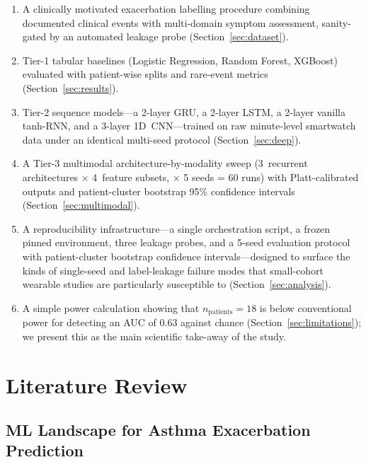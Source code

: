 \documentclass[11pt,a4paper]{article}
\begin{document}
\begin{enumerate}[nosep]
  \item A clinically motivated exacerbation labelling procedure combining
        documented clinical events with multi-domain symptom assessment,
        sanity-gated by an automated leakage probe
        (Section~\ref{sec:dataset}).
  \item Tier-1 tabular baselines (Logistic Regression, Random Forest,
        XGBoost) evaluated with patient-wise splits and rare-event metrics
        (Section~\ref{sec:results}).
  \item Tier-2 sequence models---a 2-layer GRU, a 2-layer LSTM, a 2-layer
        vanilla tanh-RNN, and a 3-layer 1D~CNN---trained on raw minute-level
        smartwatch data under an identical multi-seed protocol
        (Section~\ref{sec:deep}).
  \item A Tier-3 multimodal architecture-by-modality sweep
        (3~recurrent architectures $\times$ 4~feature subsets, $\times$ 5
        seeds = 60 runs) with Platt-calibrated outputs and patient-cluster
        bootstrap 95\% confidence intervals
        (Section~\ref{sec:multimodal}).
  \item A reproducibility infrastructure---a single orchestration script,
        a frozen pinned environment, three leakage probes, and a 5-seed
        evaluation protocol with patient-cluster bootstrap confidence
        intervals---designed to surface the kinds of single-seed and
        label-leakage failure modes that small-cohort wearable studies
        are particularly susceptible to (Section~\ref{sec:analysis}).
  \item A simple power calculation showing that
        $n_\text{patients}{=}18$ is below conventional power for
        detecting an AUC of 0.63 against chance
        (Section~\ref{sec:limitations}); we present this as the main
        scientific take-away of the study.
\end{enumerate}

\section{Literature Review}\label{sec:litreview}

\subsection{ML Landscape for Asthma Exacerbation Prediction}
\end{document}
